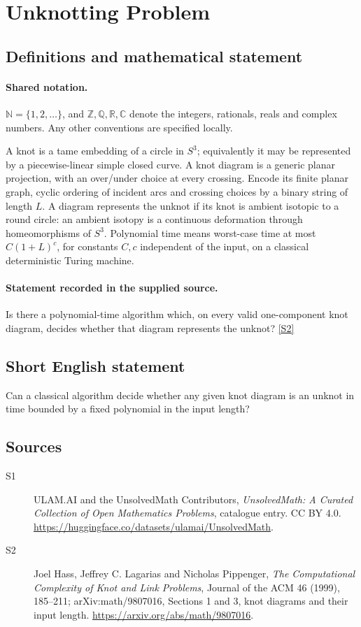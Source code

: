 \documentclass[11pt]{article}
\newcommand{\sref}[2]{\hyperlink{source:#1:#2}{[S#2]}}
\begin{document}
\section{Unknotting Problem}\label{statement}

\subsection{Definitions and mathematical statement}

\paragraph{Shared notation.}$\mathbb N=\{1,2,\ldots\}$, and $\mathbb Z,\mathbb Q,\mathbb R,\mathbb C$ denote the integers, rationals, reals and complex numbers. Any other conventions are specified locally.


A knot is a tame embedding of a circle in \(S^3\); equivalently it may
be represented by a piecewise-linear simple closed curve.
A knot diagram is a generic planar projection, with an over/under choice
at every crossing. Encode its finite planar graph, cyclic ordering of
incident arcs and crossing choices by a binary string of length \(L\).
A diagram represents the unknot if its knot is ambient isotopic to a
round circle: an ambient isotopy is a continuous deformation through
homeomorphisms of \(S^3\). Polynomial time means worst-case time
at most \(C(1+L)^c\), for constants \(C,c\) independent of the input,
on a classical deterministic Turing machine.
\paragraph{Statement recorded in the supplied source.}
Is there a polynomial-time algorithm which, on every valid
one-component knot diagram, decides whether that diagram represents
the unknot? \sref{statement}{2}
\subsection{Short English statement}
Can a classical algorithm decide whether any given knot diagram is an unknot in time bounded by a fixed polynomial in the input length?
\subsection{Sources}
\begin{description}
\item[\hypertarget{source:statement:1}{S1}] ULAM.AI and the UnsolvedMath Contributors, \emph{UnsolvedMath: A Curated Collection of Open Mathematics Problems}, catalogue entry. CC BY 4.0. \url{https://huggingface.co/datasets/ulamai/UnsolvedMath}.
\item[\hypertarget{source:statement:2}{S2}] Joel Hass, Jeffrey C. Lagarias and Nicholas Pippenger, \emph{The Computational Complexity of Knot and Link Problems}, Journal of the ACM 46 (1999), 185--211; arXiv:math/9807016, Sections 1 and 3, knot diagrams and their input length. \url{https://arxiv.org/abs/math/9807016}.
\end{description}
\label{end:statement}
\end{document}
